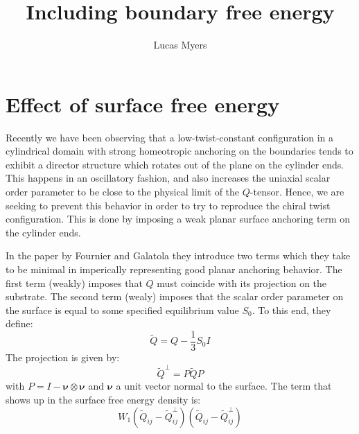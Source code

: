 \documentclass[reqno]{article}
\begin{document}
\title{Including boundary free energy}
\author{Lucas Myers}
\maketitle

\section{Effect of surface free energy}

Recently we have been observing that a low-twist-constant configuration in a cylindrical domain with strong homeotropic anchoring on the boundaries tends to exhibit a director structure which rotates out of the plane on the cylinder ends.
This happens in an oscillatory fashion, and also increases the uniaxial scalar order parameter to be close to the physical limit of the $Q$-tensor.
Hence, we are seeking to prevent this behavior in order to try to reproduce the chiral twist configuration.
This is done by imposing a weak planar surface anchoring term on the cylinder ends.

In the paper by Fournier and Galatola they introduce two terms which they take to be minimal in imperically representing good planar anchoring behavior.
The first term (weakly) imposes that $Q$ must coincide with its projection on the substrate.
The second term (wealy) imposes that the scalar order parameter on the surface is equal to some specified equilibrium value $S_0$.
To this end, they define:
\begin{equation}
    \tilde{Q}
    =
    Q
    - \frac13 S_0 I
\end{equation}
The projection is given by:
\begin{equation} \label{eq:Q-projection}
    \tilde{Q}^\perp
    =
    P \tilde{Q} P
\end{equation}
with $P = I - \boldsymbol{\nu} \otimes \boldsymbol{\nu}$ and $\boldsymbol{\nu}$ a unit vector normal to the surface.
The term that shows up in the surface free energy density is:
\begin{equation}
    W_1 \left(\tilde{Q}_{ij} - \tilde{Q}^\perp_{ij} \right)\left(\tilde{Q}_{ij} - \tilde{Q}^\perp_{ij} \right)
\end{equation}
\end{document}
